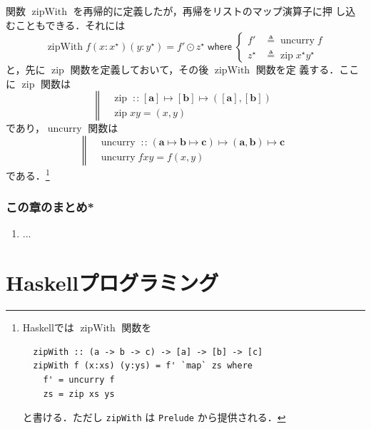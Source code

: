 \documentclass[a5paper,twoside,fleqn,draft]{jsbook}
\newcommand{\programminglanguage}[1]{\textsf{#1}}
\newcommand{\haskell}{\programminglanguage{Haskell}}
\newcommand{\code}[1]{\texttt{#1}}
\newcommand{\filename}[1]{\texttt{#1}}
\newcommand{\mBrace}{\Vert}
\newcommand{\mKeyword}[1]{\mathsf{#1}}
\newcommand{\mWhereKeyword}{\mKeyword{where}}
\DeclareMathOperator{\mWhere}{\mWhereKeyword}
\newcommand{\mSpecialFunc}[1]{#1}
\DeclareMathOperator{\mUncurry}{\mSpecialFunc{uncurry}}
\DeclareMathOperator{\mZipFunc}{\mSpecialFunc{zip}}
\DeclareMathOperator{\mZipWith}{\mSpecialFunc{zipWith}}
\DeclareMathOperator{\mIn}{{:\!:}}
\DeclareMathOperator{\mLetEq}{\triangleq}
\DeclareMathOperator{\mMapList}{\odot}
\DeclareMathOperator{\mMapsTo}{\mapsto}
\newcommand{\mType}[1]{\mathbf{#1}} %
\newcommand{\mA}{\mType{a}}
\newcommand{\mB}{\mType{b}}
\newcommand{\mC}{\mType{c}}
\newcommand{\mList}[1]{{#1}^\mathrm{\star}}
\newcommand{\mProjEXP}[2]{#1\mMapsTo#2} %
\begin{document}
関数 $\mZipWith$ を再帰的に定義したが，再帰をリストのマップ演算子に押
し込むこともできる．それには
\begin{equation}
  \mZipWith f(x:\mList{x})(y:\mList{y})
  =f'\mMapList\mList{z}
  \mWhere
  \left\{
  \begin{aligned}
    f'
    &\mLetEq\mUncurry f\\
    \mList{z}
    &\mLetEq\mZipFunc\mList{x}\mList{y}
  \end{aligned}
  \right.
\end{equation}
と，先に $\mZipFunc$ 関数を定義しておいて，その後 $\mZipWith$ 関数を定
義する．ここに $\mZipFunc$ 関数は
\begin{equation}
  \left\mBrace
  \begin{aligned}
    {}&\mZipFunc\mIn{}\mProjEXP{[\mA]}
    {\mProjEXP{[\mB]}
      {([\mA],[\mB])}}\\
    {}&\mZipFunc xy=(x,y)
  \end{aligned}
  \right.
\end{equation}
であり，$\mUncurry$ 関数は
\begin{equation}
  \left\mBrace
  \begin{aligned}
    {}&\mUncurry\mIn{}
    \mProjEXP{(\mProjEXP{\mA }{\mProjEXP{\mB }{\mC }})}
          {\mProjEXP{(\mA ,\mB )}{\mC }}\\
          {}&\mUncurry fxy=f(x,y)
  \end{aligned}
  \right.
\end{equation}
である．\footnote{\haskell では $\mZipWith$ 関数を
\begin{verbatim}
  zipWith :: (a -> b -> c) -> [a] -> [b] -> [c]
  zipWith f (x:xs) (y:ys) = f' `map` zs where
    f' = uncurry f
    zs = zip xs ys
\end{verbatim}
と書ける．ただし \code{zipWith} は \filename{Prelude} から提供される．}


\section{この章のまとめ*}

\begin{enumerate}
\item ...
\end{enumerate}

\part{\haskell プログラミング}
\end{document}
